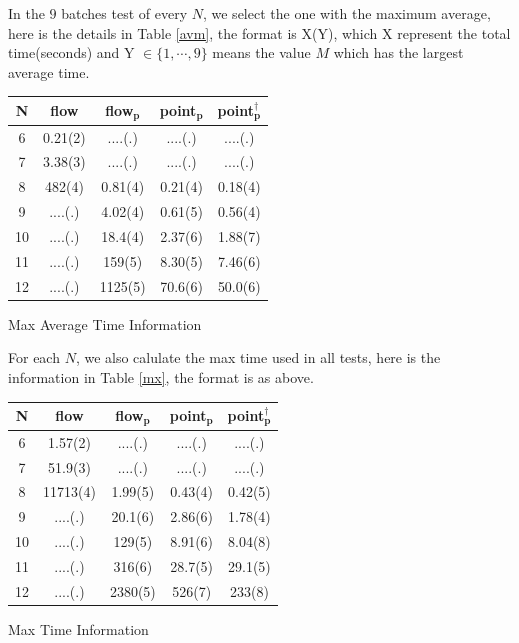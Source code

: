 \documentclass[twocolumn]{article}
\begin{document}
In the $9$ batches test of every $N$, we select the one with the maximum average, here is the details in Table \ref{avm}, the format is X(Y), which X represent the total time(seconds) and Y $\in \{1, \cdots, 9\}$ means the value $M$ which has the largest average time.

\begin{center}
\makeatletter
\def\@captype{table}
\begin{tabular}{|c|c|c|c|c|}
\hline
N & \textbf{flow} & \textbf{flow$\bm{_p}$} & \textbf{point$\bm{_p}$} & \textbf{point$\bm{_p^\dagger}$} \\
\hline
6 & 0.21(2) & ....(.) & ....(.) & ....(.)\\
\hline
7 & 3.38(3) & ....(.) & ....(.) & ....(.)\\
\hline
8 & 482(4) & 0.81(4) & 0.21(4) & 0.18(4)\\
\hline
9 & ....(.) & 4.02(4) & 0.61(5) & 0.56(4)\\
\hline
10 & ....(.) & 18.4(4) & 2.37(6) & 1.88(7)\\
\hline
11 & ....(.) & 159(5) & 8.30(5) & 7.46(6)\\
\hline
12 & ....(.) & 1125(5) & 70.6(6) & 50.0(6)\\
\hline
\end{tabular}
\caption{Max Average Time Information}
\label{avm}
\end{center}

For each $N$, we also calulate the max time used in all tests, here is the information in Table \ref{mx}, the format is as above. 

\begin{center}
\makeatletter
\def\@captype{table}
\begin{tabular}{|c|c|c|c|c|}
\hline
N & \textbf{flow} & \textbf{flow$\bm{_p}$} & \textbf{point$\bm{_p}$} & \textbf{point$\bm{_p^\dagger}$} \\
\hline
6 & 1.57(2) & ....(.) & ....(.) & ....(.)\\
\hline
7 & 51.9(3) & ....(.) & ....(.) & ....(.)\\
\hline
8 & 11713(4) & 1.99(5) & 0.43(4) & 0.42(5)\\
\hline
9 & ....(.) & 20.1(6) & 2.86(6) & 1.78(4)\\
\hline
10 & ....(.) & 129(5) & 8.91(6) & 8.04(8)\\
\hline
11 & ....(.) & 316(6) & 28.7(5) & 29.1(5)\\
\hline
12 & ....(.) & 2380(5) & 526(7) & 233(8)\\
\hline
\end{tabular}
\caption{Max Time Information}
\label{mx}
\end{center}
\end{document}

